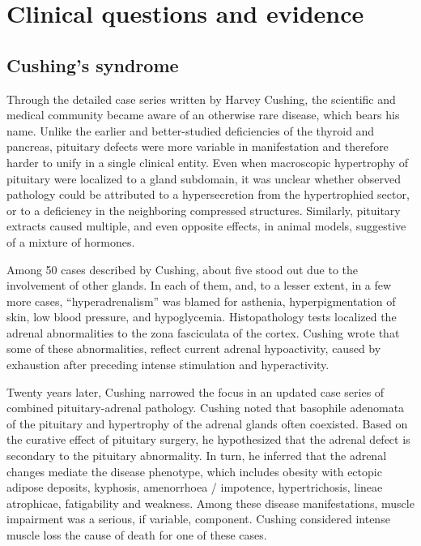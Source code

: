 \documentclass[12pt,english]{report}\usepackage[]{graphicx}\usepackage[]{color}
\providecommand{\printnomenclature}{\printglossary}
\begin{document}
\tableofcontents{}\pagebreak{}

\listoftables
\pagebreak{}

\listoffigures
\pagebreak{}

\printnomenclature[2in]{}

\clearpage
{}
\setcounter{page}{1}


\chapter{Clinical questions and evidence}


\section{Cushing's syndrome}

Through the detailed case series written by Harvey Cushing\citep{cushing1912pituitary},
the scientific and medical community became aware of an otherwise
rare disease, which bears his name. Unlike the earlier and better-studied
deficiencies of the thyroid and pancreas, pituitary defects were more
variable in manifestation and therefore harder to unify in a single
clinical entity. Even when macroscopic hypertrophy of pituitary were
localized to a gland subdomain, it was unclear whether observed pathology
could be attributed to a hypersecretion from the hypertrophied sector,
or to a deficiency in the neighboring compressed structures. Similarly,
pituitary extracts caused multiple, and even opposite effects, in
animal models\citep{schafer1899physiological}, suggestive of a mixture
of hormones.

Among 50 cases described by Cushing, about five stood out due to the
involvement of other glands. In each of them, and, to a lesser extent,
in a few more cases, ``hyperadrenalism'' was blamed for asthenia,
hyperpigmentation of skin, low blood pressure, and hypoglycemia. Histopathology
tests localized the adrenal abnormalities to the zona fasciculata
of the cortex. Cushing wrote that some of these abnormalities, reflect
current adrenal hypoactivity, caused by exhaustion after preceding
intense stimulation and hyperactivity.

Twenty years later, Cushing narrowed the focus in an updated case
series of combined pituitary-adrenal pathology\citep{cushing1932basophil}.
Cushing noted that basophile adenomata of the pituitary and hypertrophy
of the adrenal glands often coexisted. Based on the curative effect
of pituitary surgery, he hypothesized that the adrenal defect is secondary
to the pituitary abnormality. In turn, he inferred that the adrenal
changes mediate the disease phenotype, which includes obesity with
ectopic adipose deposits, kyphosis, amenorrhoea / impotence, hypertrichosis,
lineae atrophicae, fatigability and weakness. Among these disease
manifestations, muscle impairment was a serious, if variable, component.
Cushing considered intense muscle loss the cause of death for one
of these cases.
\end{document}
